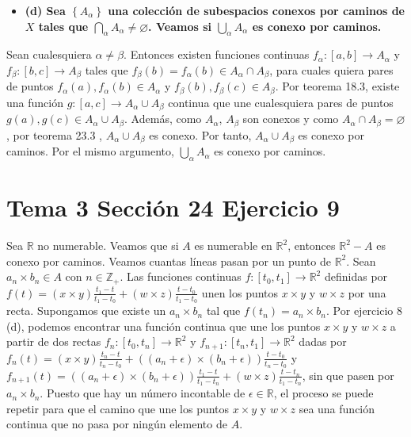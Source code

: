 \documentclass{article}
\begin{document}
\begin{itemize}
\item \bf (d) \rm Sea $\left\{A_\alpha\right\}$ una colección de subespacios conexos por caminos de $X$ tales que $\bigcap_\alpha A_\alpha\neq \varnothing$. Veamos si $\bigcup_\alpha A_\alpha$ es conexo por caminos.
\end{itemize}
Sean cualesquiera $\alpha\neq \beta$. Entonces existen funciones continuas $f_\alpha:[a,b]\rightarrow A_\alpha$  y $f_\beta:[b,c]\rightarrow A_\beta$ tales que $f_\beta(b)=f_\alpha(b)\in A_\alpha\cap A_\beta$, para cuales quiera pares de puntos $f_\alpha (a),f_\alpha (b)\in A_\alpha$ y $f_\beta (b),f_\beta (c)\in A_\beta$. Por teorema 18.3, existe una función $g:[a,c]\rightarrow A_\alpha\cup A_\beta$ continua que une cualesquiera pares de puntos $g(a),g(c)\in A_\alpha\cup A_\beta$. Además, como $A_\alpha$, $A_\beta$ son conexos y como $A_\alpha\cap A_\beta=\varnothing$, por teorema 23.3 , $A_\alpha\cup A_\beta$ es conexo. Por tanto,  $A_\alpha\cup A_\beta$ es conexo por caminos. Por el mismo argumento, $\bigcup_\alpha A_\alpha$ es conexo por caminos.
\section{Tema 3 Sección 24 Ejercicio 9}
Sea $\mathbb{R}$ no numerable. Veamos que si $A$ es numerable en $\mathbb{R}^2$, entonces $\mathbb{R}^2-A$ es conexo por caminos.
Veamos cuantas líneas pasan por un punto de $\mathbb{R}^2$. Sean $a_n\times b_n\in A$ con $n\in \mathbb{Z}_+$. Las funciones continuas $f:[t_0,t_1]\rightarrow \mathbb{R}^2$ definidas por $f(t)=(x\times y)\frac{t_1-t}{t_1-t_0}+(w\times z)\frac{t-t_0}{t_1-t_0}$ unen los puntos $x\times y$ y $w\times z$ por una recta. Supongamos que existe un $a_n\times b_n$ tal que $f(t_n)=a_n\times b_n$. Por ejercicio 8 (d), podemos encontrar una función continua que une los puntos $x\times y$ y $w\times z$ a partir de dos rectas $f_n:[t_0,t_n]\rightarrow \mathbb{R}^2$ y $f_{n+1}:[t_n,t_1]\rightarrow \mathbb{R}^2$ dadas por $f_n(t)=(x\times y)\frac{t_n-t}{t_n-t_0}+((a_n+\epsilon)\times (b_n+\epsilon))\frac{t-t_0}{t_n-t_0}$ y $f_{n+1}(t)=((a_n+\epsilon)\times (b_n+\epsilon))\frac{t_1-t}{t_1-t_n}+(w\times z)\frac{t-t_n}{t_1-t_n}$, sin que pasen por $a_n\times b_n$. Puesto que hay un número incontable de $\epsilon\in \mathbb{R}$, el proceso se puede repetir para que el camino que une los puntos $x\times y$ y $w\times z$ sea una función continua que no pasa por ningún elemento de $A$. 
\end{document}

